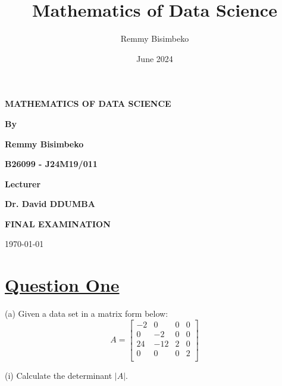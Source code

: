 \documentclass{article}
\title{Mathematics of Data Science}
\author{Remmy Bisimbeko}
\date{June 2024}
\begin{document}
\begin{titlepage}
    \centering

    \vspace{0.6cm} %
    
    \Huge\textbf{MATHEMATICS OF DATA SCIENCE}
    
    \vspace{1.5cm} %
    
    \Large\textbf{By}

     \vspace{0.7cm} %

     \Huge\textbf{Remmy Bisimbeko}
     
     \vspace{0.2cm} %
     \Large\textbf{B26099 - J24M19/011}

     \vspace{1.5cm} %

     \Large\textbf{Lecturer}

     \vspace{0.2cm} %
     \Huge\textbf{Dr. David DDUMBA}
    
    \vfill %
    
    \Large\textbf{FINAL EXAMINATION}
    
    \vspace{0.5cm} %
    
    \today %
    
\end{titlepage}

\section*{{\uline{\large Question One}}}

(a) Given a data set in a matrix form below:
    \[
    A =
    \begin{bmatrix}
    -2 & 0 & 0 & 0 \\
    0 & -2 & 0 & 0 \\
    24 & -12 & 2 & 0 \\
    0 & 0 & 0 & 2 \\
    \end{bmatrix}
    \]
    
(i) Calculate the determinant $|A|$.
\end{document}
